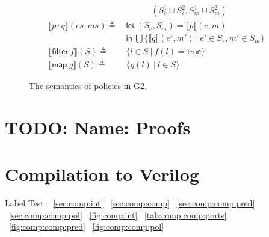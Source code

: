 \documentclass[sigconf,usenames,dvipsnames,svgnames,table]{acmart}
\newcommand{\interp}[1]{\llbracket #1 \rrbracket}
\def \sysname {\textsc{G2}\xspace}
\begin{document}
\begin{figure}
{\begin{align*}
              &\quad\quad\quad (S_e^1\cup S_e^2, S_m^1\cup S_m^2)\\
            \interp { p \cdot q }(es, ms)
              \triangleq\ &
              \mathsf{let}\ (S_e, S_m) = \interp{p}(e, m)\\
              &\mathsf{in}\ \bigcup \{\interp{q}(e',m')\ |\ e'\in S_e, m'\in S_m\}\\
              \hline
            \interp{\mathsf{filter}\ f}(S)
              \triangleq\ & \{l \in S\ |\ f(l) = \mathsf{true}\}\\
            \interp{\mathsf{map}\ g}(S)
              \triangleq\ &
              \{ g(l)\ |\ l\in S \} 
          \end{align*}}
          \caption{The semantics of policies in \sysname.}
          \label{fig:spec:sem:pol}
        \end{figure}

  \section{TODO: Name: Proofs}\label{sec:proofs}






  \section{Compilation to Verilog}\label{sec:comp}
    Label Test: 
    ~\ref{sec:comp:int}
    ~\ref{sec:comp:comp}
    ~\ref{sec:comp:comp:pred}
    ~\ref{sec:comp:comp:pol}
    ~\ref{fig:comp:int}
    ~\ref{tab:comp:comp:ports}
    ~\ref{fig:comp:comp:pred}
    ~\ref{fig:comp:comp:pol}
\end{document}
